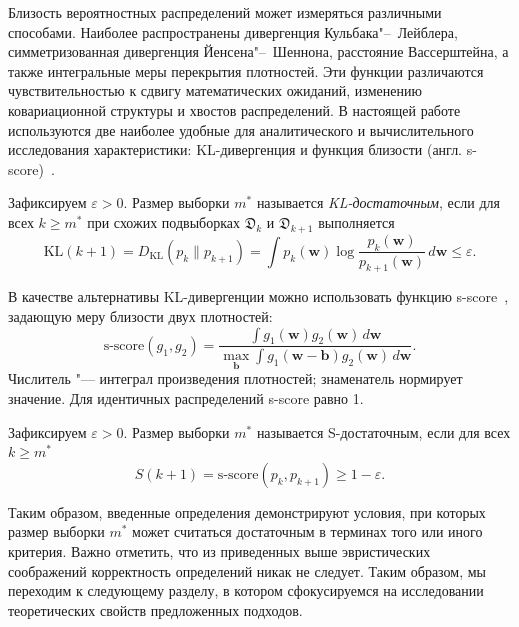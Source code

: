 Близость вероятностных распределений может измеряться различными способами. Наиболее распространены дивергенция Кульбака"--~Лейблера, симметризованная дивергенция Йенсена"--~Шеннона, расстояние Вассерштейна, а также интегральные меры перекрытия плотностей. Эти функции различаются чувствительностью к сдвигу математических ожиданий, изменению ковариационной структуры и хвостов распределений. В настоящей работе используются две наиболее удобные для аналитического и вычислительного исследования характеристики: KL-дивергенция и функция близости (англ. s-score)~\cite{cover2006,villani2009optimal,aduenko2017}.

\begin{definition}
    Зафиксируем $\varepsilon > 0$. Размер выборки $m^*$ называется \emph{KL-достаточным}, если для всех $k \geqslant m^*$ при схожих подвыборках $\mathfrak{D}_k$ и $\mathfrak{D}_{k+1}$ выполняется
    \begin{equation}
    \label{eq:KL-sufficient}
    \mathrm{KL}(k+1) = D_{\mathrm{KL}}(p_k \| p_{k+1}) = \int p_k(\mathbf{w}) \log \frac{p_k(\mathbf{w})}{p_{k+1}(\mathbf{w})} \, d\mathbf{w} \leqslant \varepsilon.
    \end{equation}
\end{definition}

В качестве альтернативы KL-дивергенции можно использовать функцию s-score~\cite{aduenko2017}, задающую меру близости двух плотностей:
\begin{equation}
    \label{eq:s-score}
    \mathrm{s}\text{-score}(g_1, g_2) = \frac{\int g_1(\mathbf{w}) g_2(\mathbf{w}) \, d\mathbf{w}}{\max_{\mathbf{b}} \int g_1(\mathbf{w} - \mathbf{b}) g_2(\mathbf{w}) \, d\mathbf{w}}.
\end{equation}
Числитель "--- интеграл произведения плотностей; знаменатель нормирует значение. Для идентичных распределений s-score равно 1.

\begin{definition}
    Зафиксируем $\varepsilon > 0$. Размер выборки $m^*$ называется S-достаточным, если для всех $k \geqslant m^*$
    \begin{equation}
    \label{eq:S-sufficient}
    S(k+1) = \mathrm{s}\text{-score}(p_k, p_{k+1}) \geqslant 1 - \varepsilon.
    \end{equation}
\end{definition}

Таким образом, введенные определения демонстрируют условия, при которых размер выборки $m^*$ может считаться достаточным в терминах того или иного критерия. Важно отметить, что из приведенных выше эвристических соображений корректность определений никак не следует. Таким образом, мы переходим к следующему разделу, в котором сфокусируемся на исследовании теоретических свойств предложенных подходов.

